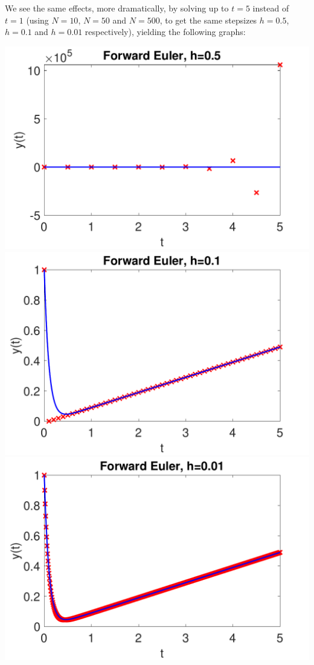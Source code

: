 \documentclass[a4paper,11pt]{article}
\begin{document}
\begin{enumerate}
    We see the same effects, more dramatically, by solving up to $t=5$ instead of $t=1$ (using $N=10$, $N=50$ and $N=500$, to get the same stepsizes $h=0.5$, $h=0.1$ and $h=0.01$ respectively), yielding the following graphs:
    \begin{center}
      \includegraphics[scale=0.3]{images/Q1a_4.pdf}
      \includegraphics[scale=0.3]{images/Q1a_5.pdf}
      \includegraphics[scale=0.3]{images/Q1a_6.pdf}
    \end{center}
    

\end{enumerate}
\end{document}
